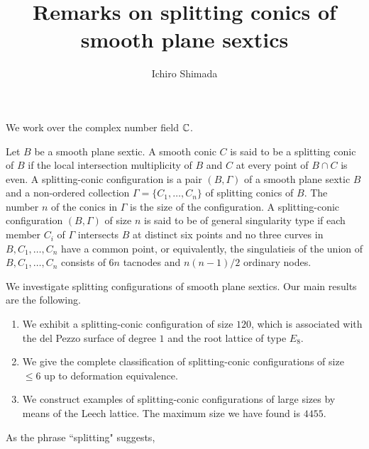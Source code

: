 \documentclass{amsart} %
\begin{document}
%
\title{Remarks on splitting conics of  smooth plane sextics} 
\author{Ichiro Shimada}
\address{Department of Mathematics,
Graduate School of Science,
Hiroshima University,
1-3-1 Kagamiyama,
Higashi-Hiroshima,
739-8526 JAPAN}
%
%

%
\begin{abstract}
\end{abstract}
%
\keywords{}
\maketitle

We work over the complex number field $\mathord{\mathbb{C}}$.
\par
Let $B$ be a smooth plane sextic.
A smooth conic $C$ is said to be a splitting conic of $B$
if the local intersection multiplicity of $B$ and $C$
at every point of $B \cap C$ is even.
A splitting-conic configuration is a pair $(B, \Gamma)$
of a smooth plane sextic $B$ and a non-ordered collection
$\Gamma = \{C_1, \ldots, C_n\}$
of splitting conics of $B$.
The number $n$ of the conics in $\Gamma$ is the size
of the configuration.
A splitting-conic configuration $(B, \Gamma)$
of size $n$
is said to be of general singularity type
if each member $C_i$ of $\Gamma$ intersects $B$
at distinct six points and no three  curves
in $B, C_1, \ldots, C_n$ have a common point,
or equivalently,
the singulatieis of 
the union of $B, C_1, \ldots, C_n$
consists of $6n$ tacnodes and $n(n-1)/2$ ordinary nodes.
\par
We investigate splitting configurations of smooth plane sextics.
Our main results are the following.
%
\begin{enumerate}
\item[(A)]
We exhibit a splitting-conic configuration of size $120$,
which is associated with the del Pezzo surface of degree $1$
and the root lattice  of type $E_8$.
%
\item[(B)]
We give the complete classification of splitting-conic configurations
of size $\le 6$ up to deformation equivalence.
%
\item[(C)]
We construct examples of splitting-conic configurations of large sizes
by means of the Leech lattice.
The maximum size we have found is $4455$.
\end{enumerate}
%
\par
As the phrase ``splitting" suggests, 
\end{document}
